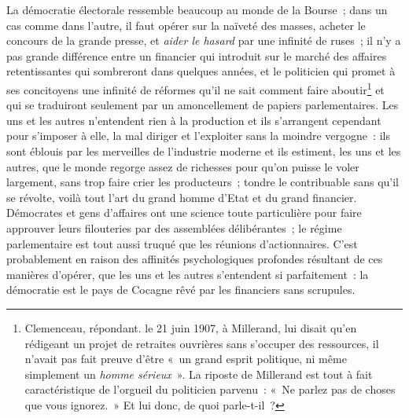 \documentclass[french,twoside]{book} %
\begin{document}
La démocratie électorale ressemble beaucoup au monde de la Bourse ; dans un cas comme dans l’autre, il faut opérer sur la naïveté des masses, acheter le concours de la grande presse, et \emph{aider le hasard} par une infinité de ruses ; il n’y a pas grande différence entre un financier qui introduit sur le marché des affaires retentissantes qui sombreront dans quelques années, et le politicien qui promet à ses concitoyens une infinité de réformes qu’il ne sait comment faire aboutir\footnote{ \noindent Clemenceau, répondant. le 21 juin 1907, à Millerand, lui disait qu’en rédigeant un projet de retraites ouvrières sans s’occuper des ressources, il n’avait pas fait preuve d’être « un grand esprit politique, ni même simplement un \emph{homme sérieux} ». La riposte de Millerand est tout à fait caractéristique de l’orgueil du politicien parvenu : « Ne parlez pas de choses que vous ignorez. » Et lui donc, de quoi parle-t-il ?
 } et qui  se traduiront seulement par un amoncellement de papiers parlementaires. Les uns et les autres n’entendent rien à la production et ils s’arrangent cependant pour s’imposer à elle, la mal diriger et l’exploiter sans la moindre vergogne : ils sont éblouis par les merveilles de l’industrie moderne et ils estiment, les uns et les autres, que le monde regorge assez de richesses pour qu’on puisse le voler largement, sans trop faire crier les producteurs ; tondre le contribuable sans qu’il se révolte, voilà tout l’art du grand homme d’Etat et du grand financier. Démocrates et gens d’affaires ont une science toute particulière pour faire approuver leurs filouteries par des assemblées délibérantes ; le régime parlementaire est tout aussi truqué que les réunions d’actionnaires. C’est probablement en raison des affinités psychologiques profondes résultant de ces manières d’opérer, que les uns et les autres s’entendent si parfaitement : la démocratie est le pays de Cocagne rêvé par les financiers sans scrupules.\par
\end{document}

